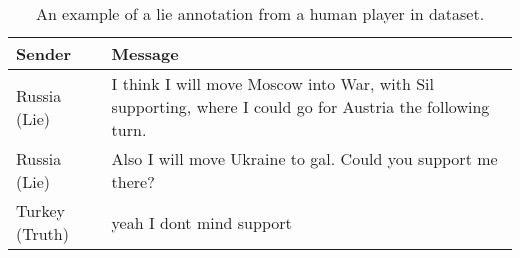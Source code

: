 \begin{table}[t]
    \begin{tabular}{p{1.2cm}p{5.4cm}}
    \hline
    \textbf{Sender} & \textbf{Message}   \\ 
    \hline
     \rowcolor{grayish} Russia (Lie) & \small{I think I will move Moscow into War, with Sil supporting, where I could go for Austria the following turn.} \\ 
    \rowcolor{grayish}  %
    Russia (Lie) & \small{Also I will move Ukraine to gal. Could you support me there?} \\
     Turkey (Truth) & \small{yeah I dont mind support} \\
  \hline
    \end{tabular}
    \caption{An example of a lie annotation from a human player in \citet{peskov2020takes} dataset.}
    \label{fig:lie_annotation}
\end{table}
